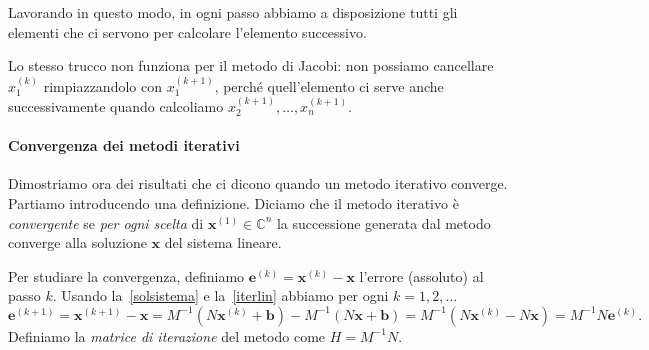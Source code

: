 \documentclass[a4paper]{report}
\theoremstyle{definiton}
\theoremstyle{remark}
\newcommand{\x}{\mathbf{x}}
\newcommand{\e}{\mathbf{e}}
\renewcommand{\b}{\mathbf{b}}
\begin{document}
Lavorando in questo modo, in ogni passo abbiamo a disposizione tutti gli elementi che ci servono per calcolare l'elemento successivo.

Lo stesso trucco non funziona per il metodo di Jacobi: non possiamo cancellare $x_1^{(k)}$ rimpiazzandolo con $x_1^{(k+1)}$, perché quell'elemento ci serve anche successivamente quando calcoliamo $x_2^{(k+1)}, \dots, x_n^{(k+1)}$.

\paragraph{Convergenza dei metodi iterativi} Dimostriamo ora dei risultati che ci dicono quando un metodo iterativo converge. Partiamo introducendo una definizione. Diciamo che il metodo iterativo è \emph{convergente} se \emph{per ogni scelta} di $\x^{(1)}\in\mathbb{C}^n$ la successione generata dal metodo converge alla soluzione $\x$ del sistema lineare.

Per studiare la convergenza, definiamo $\e^{(k)} = \x^{(k)} - \x$ l'errore (assoluto) al passo $k$. Usando la~\eqref{solsistema} e la~\eqref{iterlin} abbiamo per ogni $k=1,2,\dots$
\begin{equation} \label{ekiter}
    \e^{(k+1)} = \x^{(k+1)} - \x = M^{-1}(N\x^{(k)} + \b) - M^{-1}(N\x + \b) = M^{-1}(N\x^{(k)}-N \x) = M^{-1}N \e^{(k)}.    
\end{equation}
Definiamo la \emph{matrice di iterazione} del metodo come $H = M^{-1}N$.
\end{document}
